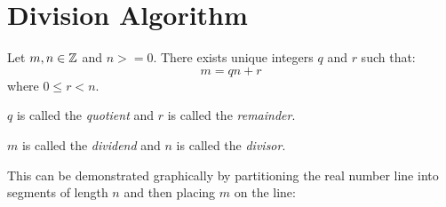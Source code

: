 \documentclass[letterpaper,12pt,fleqn]{article}
\begin{document}
\section*{Division Algorithm}

\begin{theorem}
  Let $m,n\in\mathbb{Z}$ and $n>=0$. There exists unique integers $q$ and $r$ such that:
  \[m=qn+r\]
  where $0\le r<n$.

  $q$ is called the \emph{quotient} and $r$ is called the \emph{remainder}.
  
  $m$ is called the \emph{dividend} and $n$ is called the \emph{divisor}.
\end{theorem}

This can be demonstrated graphically by partitioning the real number line into
segments of length $n$ and then placing $m$ on the line:

\bigskip

\begin{center}
\end{center}
\end{document}
